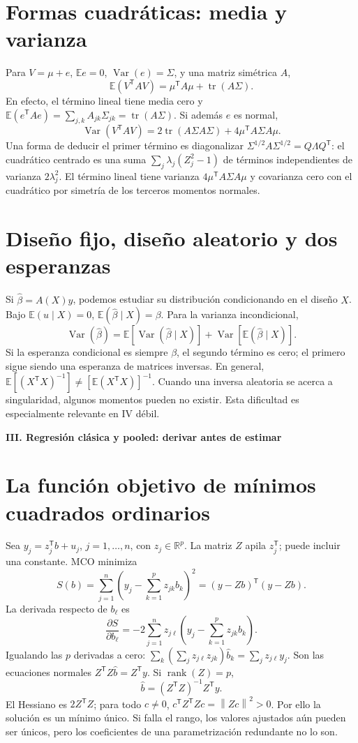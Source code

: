 \documentclass[11pt,a4paper]{article}
\newcommand{\R}{\mathbb R}
\newcommand{\E}{\mathbb E}
\newcommand{\T}{^{\mathsf T}}
\newcommand{\norm}[1]{\left\lVert #1\right\rVert}
\DeclareMathOperator{\Var}{Var}
\DeclareMathOperator{\tr}{tr}
\DeclareMathOperator{\rank}{rank}
\theoremstyle{definition}
\newcommand{\parte}[1]{\par\bigskip\Needspace{8\baselineskip}\begin{center}{\Large\bfseries\color{azul}#1}\end{center}}
\begin{document}
\section{Formas cuadráticas: media y varianza}
Para $V=\mu+e$, $\E e=0$, $\Var(e)=\Sigma$, y una matriz simétrica $A$,
\[
\E(V\T AV)=\mu\T A\mu+\tr(A\Sigma).
\]
En efecto, el término lineal tiene media cero y
$\E(e\T Ae)=\sum_{j,k}A_{jk}\Sigma_{jk}=\tr(A\Sigma)$.
Si además $e$ es normal,
\[
\Var(V\T AV)=2\tr(A\Sigma A\Sigma)+4\mu\T A\Sigma A\mu.
\]
Una forma de deducir el primer término es diagonalizar
$\Sigma^{1/2}A\Sigma^{1/2}=Q\Lambda Q\T$: el cuadrático centrado es una suma $\sum_j\lambda_j(Z_j^2-1)$ de términos independientes de varianza $2\lambda_j^2$. El término lineal tiene varianza $4\mu\T A\Sigma A\mu$ y covarianza cero con el cuadrático por simetría de los terceros momentos normales.

\section{Diseño fijo, diseño aleatorio y dos esperanzas}
Si $\widehat\beta=A(X)y$, podemos estudiar su distribución condicionando en el diseño $X$. Bajo $\E(u\mid X)=0$,
$\E(\widehat\beta\mid X)=\beta$.
Para la varianza incondicional,
\[
\Var(\widehat\beta)
=\E[\Var(\widehat\beta\mid X)]
+\Var[\E(\widehat\beta\mid X)].
\]
Si la esperanza condicional es siempre $\beta$, el segundo término es cero; el primero sigue siendo una esperanza de matrices inversas. En general,
$\E[(X\T X)^{-1}]\ne[\E(X\T X)]^{-1}$.
Cuando una inversa aleatoria se acerca a singularidad, algunos momentos pueden no existir. Esta dificultad es especialmente relevante en IV débil.



\parte{III. Regresión clásica y pooled: derivar antes de estimar}
\section{La función objetivo de mínimos cuadrados ordinarios}
Sea $y_j=z_j\T b+u_j$, $j=1,\ldots,n$, con $z_j\in\R^p$. La matriz $Z$ apila $z_j\T$; puede incluir una constante. MCO minimiza
\[
S(b)=\sum_{j=1}^n\left(y_j-\sum_{k=1}^p z_{jk}b_k\right)^2
=(y-Zb)\T(y-Zb).
\]
La derivada respecto de $b_\ell$ es
\[
\frac{\partial S}{\partial b_\ell}
=-2\sum_{j=1}^n z_{j\ell}
\left(y_j-\sum_{k=1}^p z_{jk}b_k\right).
\]
Igualando las $p$ derivadas a cero:
$\sum_k(\sum_jz_{j\ell}z_{jk})\widehat b_k=\sum_jz_{j\ell}y_j$.
Son las ecuaciones normales $Z\T Z\widehat b=Z\T y$.
Si $\rank(Z)=p$,
\[
\widehat b=(Z\T Z)^{-1}Z\T y.
\]
El Hessiano es $2Z\T Z$; para todo $c\ne0$, $c\T Z\T Zc=\norm{Zc}^2>0$. Por ello la solución es un mínimo único. Si falla el rango, los valores ajustados aún pueden ser únicos, pero los coeficientes de una parametrización redundante no lo son.
\end{document}
